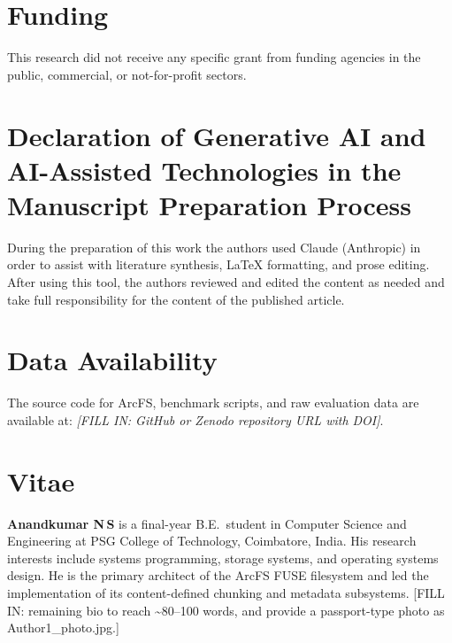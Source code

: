 \documentclass[5p,times]{elsarticle}
\begin{document}
\section*{Funding}
This research did not receive any specific grant from funding agencies
in the public, commercial, or not-for-profit sectors.

\section*{Declaration of Generative AI and AI-Assisted Technologies
         in the Manuscript Preparation Process}
During the preparation of this work the authors used Claude (Anthropic)
in order to assist with literature synthesis, LaTeX formatting, and prose
editing. After using this tool, the authors reviewed and edited the content
as needed and take full responsibility for the content of the published
article.

\section*{Data Availability}
The source code for ArcFS, benchmark scripts, and raw evaluation data
are available at:
\textit{[FILL IN: GitHub or Zenodo repository URL with DOI]}.





\section*{Vitae}

\noindent\textbf{Anandkumar N\,S} is a final-year B.E.\ student in
Computer Science and Engineering at PSG College of Technology, Coimbatore,
India. His research interests include systems programming, storage
systems, and operating systems design. He is the primary architect of
the ArcFS FUSE filesystem and led the implementation of its
content-defined chunking and metadata subsystems.
[FILL IN: remaining bio to reach \textasciitilde{}80--100 words, and
provide a passport-type photo as Author1\_photo.jpg.]
\end{document}
